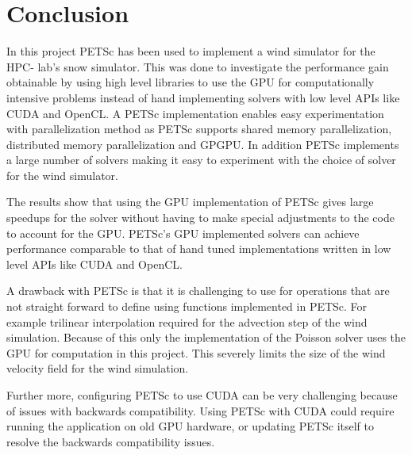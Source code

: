 \chapter{Conclusion}

In this project PETSc has been used to implement a wind simulator for the HPC-
lab's snow simulator. This was done to investigate the performance gain
obtainable by using high level libraries to use the GPU for computationally
intensive problems instead of hand implementing solvers with low level APIs like
CUDA and OpenCL. A PETSc implementation enables easy experimentation with
parallelization method as PETSc supports shared memory parallelization,
distributed memory parallelization and GPGPU. In addition PETSc implements a
large number of solvers making it easy to experiment with the choice of solver
for the wind simulator.

The results show that using the GPU implementation of PETSc gives large speedups
for the solver without having to make special adjustments to the code to account
for the GPU. PETSc's GPU implemented solvers can achieve performance comparable
to that of hand tuned implementations written in low level APIs like CUDA and
OpenCL.

A drawback with PETSc is that it is challenging to use for
operations that are not straight forward to define using functions implemented
in PETSc. For example trilinear interpolation required for the advection step of
the wind simulation. Because of this only the implementation of the Poisson
solver uses the GPU for computation in this project. This severely limits the
size of the wind velocity field for the wind simulation.

Further more, configuring PETSc to use CUDA can be very challenging because of
issues with backwards compatibility. Using PETSc with CUDA could require running
the application on old GPU hardware, or updating PETSc itself to resolve the
backwards compatibility issues.
